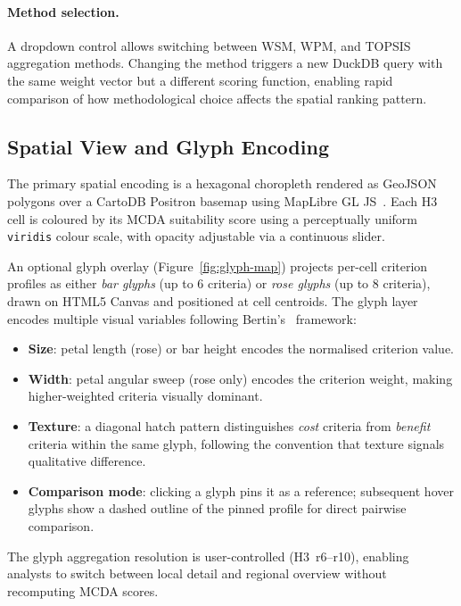 \paragraph{Method selection.}
A dropdown control allows switching between WSM, WPM, and TOPSIS aggregation methods. Changing the method triggers a new DuckDB query with the same weight vector but a different scoring function, enabling rapid comparison of how methodological choice affects the spatial ranking pattern.

\subsection{Spatial View and Glyph Encoding}
\label{sec:spatial-view}

The primary spatial encoding is a hexagonal choropleth rendered as GeoJSON polygons over a CartoDB Positron basemap using MapLibre GL JS~\cite{maplibregl}. Each H3 cell is coloured by its MCDA suitability score using a perceptually uniform \texttt{viridis} colour scale, with opacity adjustable via a continuous slider.

An optional glyph overlay (Figure~\ref{fig:glyph-map}) projects per-cell criterion profiles as either \emph{bar glyphs} (up to 6 criteria) or \emph{rose glyphs} (up to 8 criteria), drawn on HTML5 Canvas and positioned at cell centroids. The glyph layer encodes multiple visual variables following Bertin's~\cite{bertin1983semiology} framework:

\begin{itemize}[nosep]
    \item \textbf{Size}: petal length (rose) or bar height encodes the normalised criterion value.
    \item \textbf{Width}: petal angular sweep (rose only) encodes the criterion weight, making higher-weighted criteria visually dominant.
    \item \textbf{Texture}: a diagonal hatch pattern distinguishes \emph{cost} criteria from \emph{benefit} criteria within the same glyph, following the convention that texture signals qualitative difference.
    \item \textbf{Comparison mode}: clicking a glyph pins it as a reference; subsequent hover glyphs show a dashed outline of the pinned profile for direct pairwise comparison.
\end{itemize}

\noindent The glyph aggregation resolution is user-controlled (H3~r6--r10), enabling analysts to switch between local detail and regional overview without recomputing MCDA scores.

